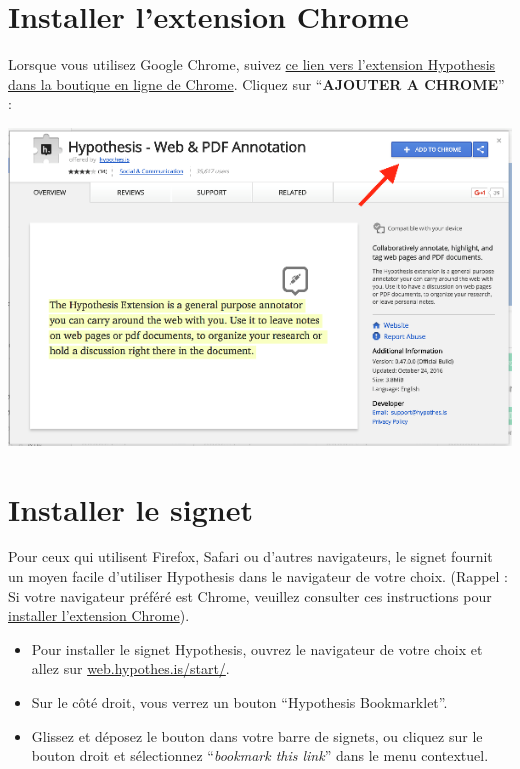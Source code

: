 \documentclass[
]{book}
\providecommand{\tightlist}{%
  \setlength{\itemsep}{0pt}\setlength{\parskip}{0pt}}
\begin{document}
\hypertarget{s21}{%
\section{Installer l'extension Chrome}\label{s21}}

Lorsque vous utilisez Google Chrome, suivez \href{https://chrome.google.com/webstore/detail/hypothesis-web-pdf-annota/bjfhmglciegochdpefhhlphglcehbmek}{ce lien vers l'extension Hypothesis dans la boutique en ligne de Chrome}. Cliquez sur ``\textbf{AJOUTER A CHROME}'' :

\includegraphics{img/94d5e4f1e0139b6a3709c5bfecad0737.png}

\hypertarget{s22}{%
\section{Installer le signet}\label{s22}}

Pour ceux qui utilisent Firefox, Safari ou d'autres navigateurs, le signet fournit un moyen facile d'utiliser Hypothesis dans le navigateur de votre choix. (Rappel : Si votre navigateur préféré est Chrome, veuillez consulter ces instructions pour \protect\hyperlink{s21}{installer l'extension Chrome}).

\begin{itemize}
\tightlist
\item
  Pour installer le signet Hypothesis, ouvrez le navigateur de votre choix et allez sur \href{https://web.hypothes.is/start/}{web.hypothes.is/start/}.
\item
  Sur le côté droit, vous verrez un bouton ``Hypothesis Bookmarklet''.
\item
  Glissez et déposez le bouton dans votre barre de signets, ou cliquez sur le bouton droit et sélectionnez ``\emph{bookmark this link}'' dans le menu contextuel.
\end{itemize}
\end{document}
